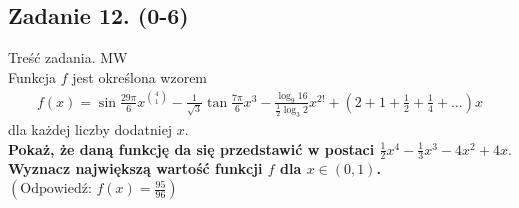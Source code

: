 \subsection*{Zadanie 12. (0-6)} 
Treść zadania. MW \\
Funkcja $f$ jest określona wzorem
\begin{align*}
    f(x)= \sin{\frac{29\pi}{6}}x^{\binom{4}{1}}-\frac{1}{\sqrt{3}}\tan{\frac{7\pi}{6}}x^{3}-\frac{\log_{9}{16}}{\frac{1}{2}\log_{3}{2}}x^{2!}+\left(2+1+\frac{1}{2}+\frac{1}{4}+\dots \right)x
\end{align*}
dla każdej liczby dodatniej $x$. \\
\textbf{Pokaż, że daną funkcję da się przedstawić w postaci $\frac{1}{2}x^{4}-\frac{1}{3}x^{3}-4x^{2}+4x$}.
\textbf{Wyznacz największą wartość funkcji $f$ dla $x\in \left(0,1\right)$.}
$\left(\text{Odpowiedź: } f(x)=\frac{95}{96} \right)$
